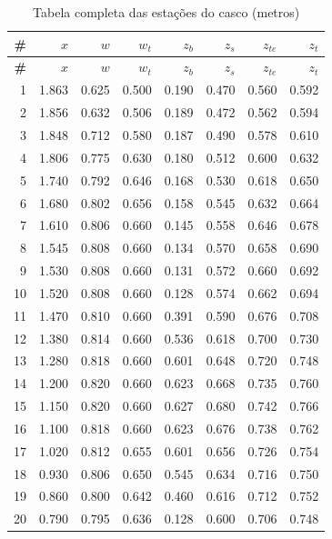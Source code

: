 \begin{longtable}{rrrrrrrr}
\caption{Tabela completa das esta\c{c}\~oes do casco (metros)}\label{tab:estacoes}\\
\toprule
\textbf{\#} & \textbf{$x$} & \textbf{$w$} & \textbf{$w_t$} & \textbf{$z_b$} &
\textbf{$z_s$} & \textbf{$z_{te}$} & \textbf{$z_t$} \\
\midrule
\endfirsthead
\toprule
\textbf{\#} & \textbf{$x$} & \textbf{$w$} & \textbf{$w_t$} & \textbf{$z_b$} &
\textbf{$z_s$} & \textbf{$z_{te}$} & \textbf{$z_t$} \\
\midrule
\endhead
1 & 1.863 & 0.625 & 0.500 & 0.190 & 0.470 & 0.560 & 0.592 \\
2 & 1.856 & 0.632 & 0.506 & 0.189 & 0.472 & 0.562 & 0.594 \\
3 & 1.848 & 0.712 & 0.580 & 0.187 & 0.490 & 0.578 & 0.610 \\
4 & 1.806 & 0.775 & 0.630 & 0.180 & 0.512 & 0.600 & 0.632 \\
5 & 1.740 & 0.792 & 0.646 & 0.168 & 0.530 & 0.618 & 0.650 \\
6 & 1.680 & 0.802 & 0.656 & 0.158 & 0.545 & 0.632 & 0.664 \\
7 & 1.610 & 0.806 & 0.660 & 0.145 & 0.558 & 0.646 & 0.678 \\
8 & 1.545 & 0.808 & 0.660 & 0.134 & 0.570 & 0.658 & 0.690 \\
9 & 1.530 & 0.808 & 0.660 & 0.131 & 0.572 & 0.660 & 0.692 \\
10 & 1.520 & 0.808 & 0.660 & 0.128 & 0.574 & 0.662 & 0.694 \\
11 & 1.470 & 0.810 & 0.660 & 0.391 & 0.590 & 0.676 & 0.708 \\
12 & 1.380 & 0.814 & 0.660 & 0.536 & 0.618 & 0.700 & 0.730 \\
13 & 1.280 & 0.818 & 0.660 & 0.601 & 0.648 & 0.720 & 0.748 \\
14 & 1.200 & 0.820 & 0.660 & 0.623 & 0.668 & 0.735 & 0.760 \\
15 & 1.150 & 0.820 & 0.660 & 0.627 & 0.680 & 0.742 & 0.766 \\
16 & 1.100 & 0.818 & 0.660 & 0.623 & 0.676 & 0.738 & 0.762 \\
17 & 1.020 & 0.812 & 0.655 & 0.601 & 0.656 & 0.726 & 0.754 \\
18 & 0.930 & 0.806 & 0.650 & 0.545 & 0.634 & 0.716 & 0.750 \\
19 & 0.860 & 0.800 & 0.642 & 0.460 & 0.616 & 0.712 & 0.752 \\
20 & 0.790 & 0.795 & 0.636 & 0.128 & 0.600 & 0.706 & 0.748 \\

\end{longtable}
